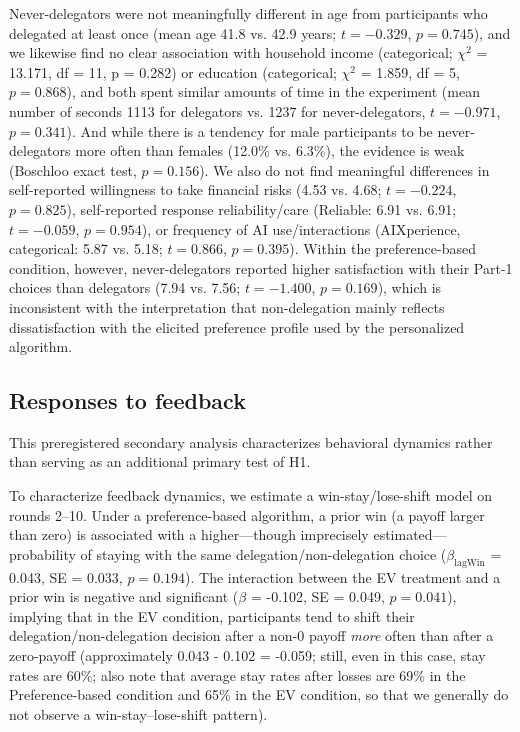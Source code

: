 \documentclass[a4paper, 12pt, fleqn]{article}
\theoremstyle{definition}
\begin{document}
Never-delegators were not meaningfully different in age from participants who delegated at least once (mean age 41.8 vs. 42.9 years; $t = -0.329$, $p = 0.745$), and we likewise find no clear association with household income (categorical; \(\chi^2\) = 13.171, df = 11, p = 0.282) or education (categorical; \(\chi^2\) = 1.859, df = 5, $p = 0.868$), and both spent similar amounts of time in the experiment (mean number of seconds 1113 for delegators vs. 1237 for never-delegators, $t = -0.971$, $p = 0.341$). And while there is a tendency for male participants to be never-delegators more often than females (12.0\% vs. 6.3\%), the evidence is weak (Boschloo exact test, $p = 0.156$). We also do not find meaningful differences in self-reported willingness to take financial risks (4.53 vs. 4.68; $t = -0.224$, $p = 0.825$), self-reported response reliability/care (Reliable: 6.91 vs. 6.91; $t = -0.059$, $p = 0.954$), or frequency of AI use/interactions (AIXperience, categorical: 5.87 vs. 5.18; $t = 0.866$, $p = 0.395$).
Within the preference-based condition, however, never-delegators reported higher satisfaction with their Part-1 choices than delegators (7.94 vs. 7.56; $t = -1.400$, $p = 0.169$), which is inconsistent with the interpretation that non-delegation mainly reflects dissatisfaction with the elicited preference profile used by the personalized algorithm.



\subsection{Responses to feedback}
This preregistered secondary analysis characterizes behavioral dynamics rather than serving as an additional primary test of H1.

To characterize feedback dynamics, we estimate a win-stay/lose-shift model on rounds 2--10. Under a preference-based algorithm, a prior win (a payoff larger than zero) is associated with a higher—though imprecisely estimated—probability of staying with the same delegation/non-delegation choice (\(\beta_{\text{lagWin}}\) = 0.043, SE = 0.033, $p = 0.194$). The interaction between the EV treatment and a prior win is negative and significant ($\beta$ = -0.102, SE = 0.049, $p = 0.041$), implying that in the EV condition, participants tend to shift their delegation/non-delegation decision after a non-0 payoff \textit{more} often than after a zero-payoff (approximately 0.043 - 0.102 = -0.059; still, even in this case, stay rates are 60\%; also note that average stay rates after losses are 69\% in the Preference-based condition and 65\% in the EV condition, so that we generally do not observe a win-stay--lose-shift pattern).
\end{document}
